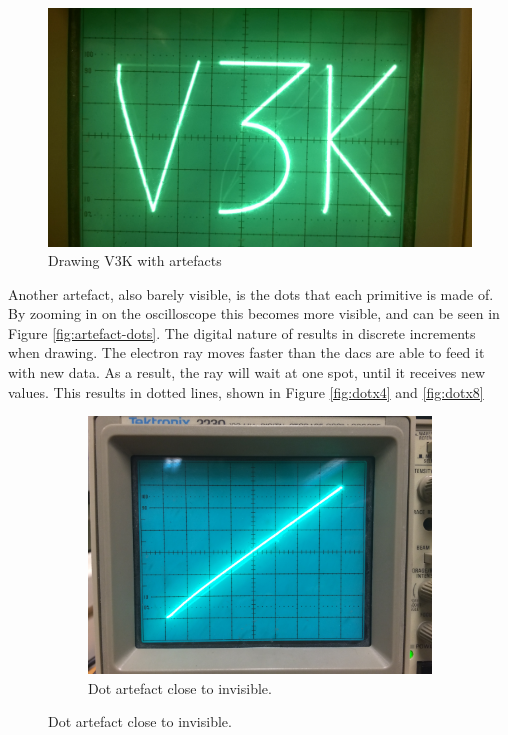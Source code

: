 \begin{figure}[h!]
	    \includegraphics[width=\linewidth]{images/artefacts.jpg}
	    \caption{Drawing V3K with artefacts}
	    \label{fig:artefact}
\end{figure}

Another artefact, also barely visible, is the dots that each primitive is made of.
By zooming in on the oscilloscope this becomes more visible, and can be seen in Figure \ref{fig:artefact-dots}.
The digital nature of \vthreek results in discrete increments when drawing.
The electron ray moves faster than the \gls{dac}s are able to feed it with new data.
As a result, the ray will wait at one spot, until it receives new values.
This results in dotted lines, shown in Figure \ref{fig:dotx4} and \ref{fig:dotx8}

\begin{figure}[h!]
   	\centering
    \begin{subfigure}[b]{\textwidth}
   		\centering
       	\includegraphics[height=0.4\textheight]{images/dots_x1.jpg}
       	\caption{Dot artefact close to invisible.}
       	\label{fig:dotx1}
    \end{subfigure}
\end{figure}

